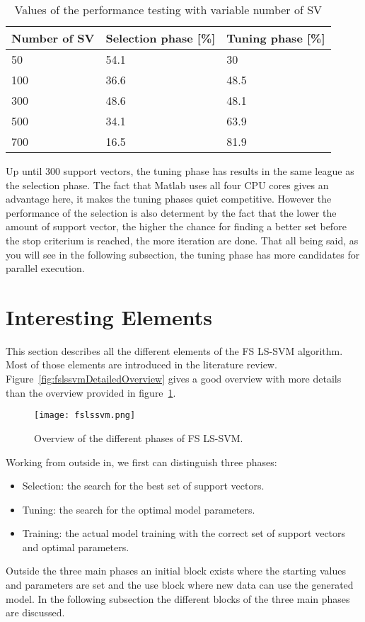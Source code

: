 \begin{table}[]
	\centering
	\begin{tabular}{lll}
		Number of SV             & Selection phase {[}\%{]} & Tuning phase {[}\%{]} \\ \hline
		\multicolumn{1}{l|}{50}  & 54.1                     & 30                    \\
		\multicolumn{1}{l|}{100} & 36.6                     & 48.5                  \\
		\multicolumn{1}{l|}{300} & 48.6                     & 48.1                  \\
		\multicolumn{1}{l|}{500} & 34.1                     & 63.9                  \\
		\multicolumn{1}{l|}{700} & 16.5                     & 81.9                 
	\end{tabular}
	\caption{Values of the performance testing with variable number of SV}
	\label{tab:perf}
\end{table}
Up until 300 support vectors, the tuning phase has results in the same league as the selection phase.
The fact that Matlab uses all four CPU cores gives an advantage here, it makes the tuning phases quiet competitive.
However the performance of the selection is also determent by the fact that the lower the amount of support vector, the higher the chance for finding a better set before the stop criterium is reached, the more iteration are done.
That all being said, as you will see in the following subsection, the tuning phase has more candidates for parallel execution.
\section{Interesting Elements}
This section describes all the different elements of the FS LS-SVM algorithm.
Most of those elements are introduced in the literature review. 
Figure~\ref{fig:fslssvmDetailedOverview} gives a good overview with more details than the overview provided in figure~\ref{fig:fslssvmoverview}.
\begin{figure}
	\centering
	\texttt{[image: fslssvm.png]}
	\caption{Overview of the different phases of FS LS-SVM.}
	\label{fig:fslssvmoverview}
\end{figure}
Working from outside in, we first can distinguish three phases:
\begin{itemize}
	\item Selection: the search for the best set of support vectors.
	\item Tuning: the search for the optimal model parameters.
	\item Training: the actual model training with the correct set of support vectors and optimal parameters.
\end{itemize}
Outside the three main phases an initial block exists where the starting values and parameters are set and the use block where new data can use the generated model.
In the following subsection the different blocks of the three main phases are discussed.
